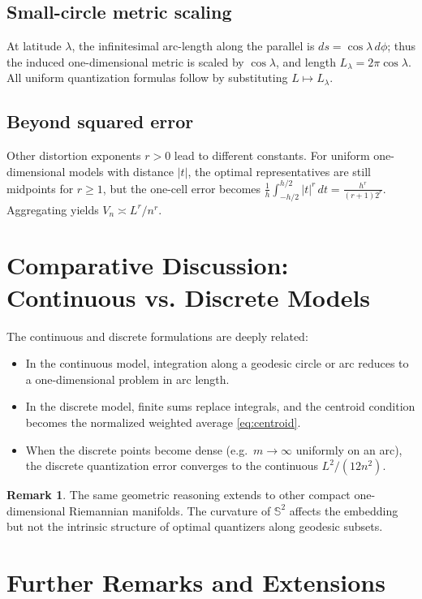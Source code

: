 \documentclass[12pt, reqno]{amsart}
\theoremstyle{plain}
\theoremstyle{definition}
\newtheorem{remark}[subsection]{Remark}
\newcommand{\D}[1]{\mathbb{#1}}%
\begin{document}
\subsection{Small-circle metric scaling}
At latitude $\lambda$, the infinitesimal arc-length along the parallel is $ds=\cos\lambda\, d\phi$; thus the induced one-dimensional metric is scaled by $\cos\lambda$, and length $L_\lambda=2\pi\cos\lambda$. All uniform quantization formulas follow by substituting $L\mapsto L_\lambda$.

\subsection{Beyond squared error}
Other distortion exponents $r>0$ lead to different constants. For uniform one-dimensional models with distance $|t|$, the optimal representatives are still midpoints for $r\ge 1$, but the one-cell error becomes $\frac{1}{h}\int_{-h/2}^{h/2}|t|^r\,dt = \frac{h^r}{(r+1)2^{r}}$. Aggregating yields $V_n\asymp L^r/n^r$.

\section{Comparative Discussion: Continuous vs. Discrete Models}

The continuous and discrete formulations are deeply related:

\begin{itemize}
\item In the continuous model, integration along a geodesic circle or arc reduces to a one-dimensional problem in arc length. 
\item In the discrete model, finite sums replace integrals, and the centroid condition becomes the normalized weighted average \eqref{eq:centroid}.
\item When the discrete points become dense (e.g.\ $m\to\infty$ uniformly on an arc), the discrete quantization error converges to the continuous $L^2/(12n^2)$.
\end{itemize}

\begin{remark}
The same geometric reasoning extends to other compact one-dimensional Riemannian manifolds. 
The curvature of $\D S^2$ affects the embedding but not the intrinsic structure of optimal quantizers along geodesic subsets.
\end{remark}

\section{Further Remarks and Extensions}
\end{document}
